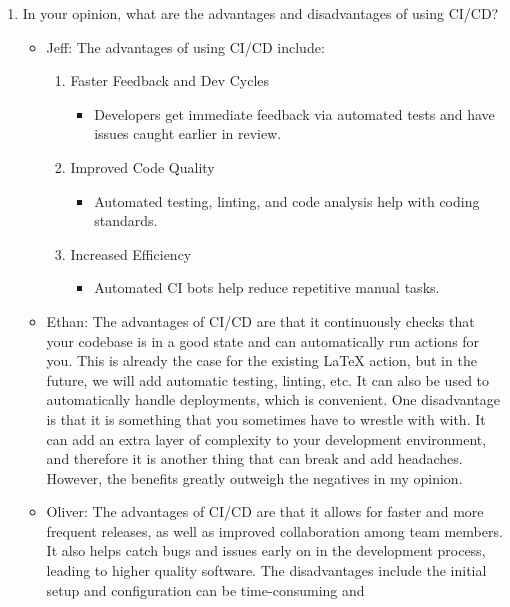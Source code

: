 \documentclass{article}
\begin{document}
{\begin{enumerate}
\begin{itemize}
	\end{itemize}
    \item In your opinion, what are the advantages and disadvantages of using
    CI/CD?
	\begin{itemize}
		\item Jeff: The advantages of using CI/CD include: 
    \begin{enumerate}
      \item Faster Feedback and Dev Cycles
      \begin{itemize}
        \item Developers get immediate feedback via automated tests 
        and have issues caught earlier in review.
      \end{itemize}
      \item Improved Code Quality
      \begin{itemize}
        \item Automated testing, linting, and code analysis help
        with coding standards.
      \end{itemize}
      \item Increased Efficiency
      \begin{itemize}
        \item Automated CI bots help reduce repetitive manual tasks.
      \end{itemize}
    \end{enumerate}
    \item Ethan: The advantages of CI/CD are that it continuously checks that
      your codebase is in a good state and can automatically run actions for
      you. This is already the case for the existing LaTeX action, but in the
      future, we will add automatic testing, linting, etc. It can also be used
      to automatically handle deployments, which is convenient. One
      disadvantage is that it is something that you sometimes have to wrestle with
      with. It can add an extra layer of complexity to your development
      environment, and therefore it is another thing that can break and add
      headaches. However, the benefits greatly outweigh the negatives in my
      opinion.
		\item Oliver: The advantages of CI/CD are that it allows for 
    faster and more frequent releases, as well as improved collaboration 
    among team members. It also helps catch bugs and issues early on in the 
    development process, leading to higher quality software. The disadvantages 
    include the initial setup and configuration can be time-consuming and 

\end{itemize}
\end{enumerate}}
\end{document}

